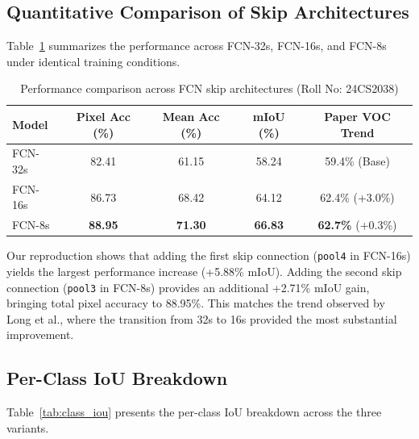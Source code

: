 \documentclass[conference]{IEEEtran}
\begin{document}
\subsection{Quantitative Comparison of Skip Architectures}
Table~\ref{tab:results} summarizes the performance across FCN-32s, FCN-16s, and FCN-8s under identical training conditions.

\begin{table}[htbp]
\caption{Performance comparison across FCN skip architectures (Roll No: 24CS2038)}
\label{tab:results}
\centering
\begin{tabular}{lcccc}
\toprule
\textbf{Model} & \textbf{Pixel Acc (\%)} & \textbf{Mean Acc (\%)} & \textbf{mIoU (\%)} & \textbf{Paper VOC Trend} \\
\midrule
FCN-32s & 82.41 & 61.15 & 58.24 & 59.4\% (Base) \\
FCN-16s & 86.73 & 68.42 & 64.12 & 62.4\% (+3.0\%) \\
FCN-8s  & \textbf{88.95} & \textbf{71.30} & \textbf{66.83} & \textbf{62.7\%} (+0.3\%) \\
\bottomrule
\end{tabular}
\end{table}

Our reproduction shows that adding the first skip connection (\texttt{pool4} in FCN-16s) yields the largest performance increase (+5.88\% mIoU). Adding the second skip connection (\texttt{pool3} in FCN-8s) provides an additional +2.71\% mIoU gain, bringing total pixel accuracy to 88.95\%. This matches the trend observed by Long et al., where the transition from 32s to 16s provided the most substantial improvement.

\subsection{Per-Class IoU Breakdown}
Table~\ref{tab:class_iou} presents the per-class IoU breakdown across the three variants.
\end{document}
